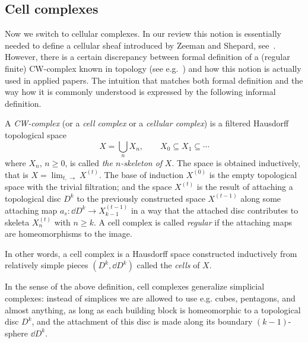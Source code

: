 
\subsection{Cell complexes} 

Now we switch to cellular complexes. In our review this notion is essentially needed to define a cellular sheaf introduced by Zeeman and Shepard, see~\cite{Curry}. However, there is a certain discrepancy between formal definition of a (regular finite) CW-complex known in topology (see e.g.~\cite{bjorner1984poset}) and how this notion is actually used in applied papers. The intuition that matches both formal definition and the way how it is commonly understood is expressed by the following informal definition.

\begin{difin}\label{difinCWhausdorff}
A \emph{CW-complex} (or a \emph{cell complex} or a \emph{cellular complex}) is a filtered Hausdorff topological space
\[
X=\bigcup_nX_n, \qquad X_0\subseteq X_1\subseteq\cdots
\]
where $X_n$, $n\geq 0$, is called \emph{the $n$-skeleton of} $X$. The space is obtained inductively, that is $X=\lim_{t,\to} X^{(t)}$. The base of induction $X^{(0)}$ is the empty topological space with the trivial filtration; and the space $X^{(t)}$ is the result of attaching a topological disc $D^k$ to the previously constructed space $X^{(t-1)}$ along some attaching map $a_s\colon \dd D^k\to X^{(t-1)}_{k-1}$ in a way that the attached disc contributes to skeleta $X^{(t)}_n$ with $n\geq k$. A cell complex is called \emph{regular} if the attaching maps are homeomorphisms to the image.

In other words, a cell complex is a Hausdorff space constructed inductively from relatively simple pieces $(D^k,\dd D^k)$ called the \emph{cells} of $X$.
\end{difin}

\begin{rem}\label{remBuildingBlocks}
In the sense of the above definition, cell complexes generalize simplicial complexes: instead of simplices we are allowed to use e.g. cubes, pentagons, and almost anything, as long as each building block is homeomorphic to a topological disc $D^k$, and the attachment of this disc is made along its boundary $(k-1)$-sphere $\dd D^k$.
\end{rem}

